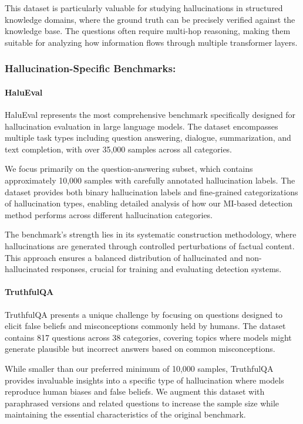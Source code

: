 This dataset is particularly valuable for studying hallucinations in structured knowledge domains, where the ground truth can be precisely verified against the knowledge base. The questions often require multi-hop reasoning, making them suitable for analyzing how information flows through multiple transformer layers.

\subsubsection{Hallucination-Specific Benchmarks:}

\paragraph{HaluEval}
HaluEval \citep{li2023halueval} represents the most comprehensive benchmark specifically designed for hallucination evaluation in large language models. The dataset encompasses multiple task types including question answering, dialogue, summarization, and text completion, with over 35,000 samples across all categories.

We focus primarily on the question-answering subset, which contains approximately 10,000 samples with carefully annotated hallucination labels. The dataset provides both binary hallucination labels and fine-grained categorizations of hallucination types, enabling detailed analysis of how our MI-based detection method performs across different hallucination categories.

The benchmark's strength lies in its systematic construction methodology, where hallucinations are generated through controlled perturbations of factual content. This approach ensures a balanced distribution of hallucinated and non-hallucinated responses, crucial for training and evaluating detection systems.

\paragraph{TruthfulQA}
TruthfulQA \citep{lin2021truthfulqa} presents a unique challenge by focusing on questions designed to elicit false beliefs and misconceptions commonly held by humans. The dataset contains 817 questions across 38 categories, covering topics where models might generate plausible but incorrect answers based on common misconceptions.

While smaller than our preferred minimum of 10,000 samples, TruthfulQA provides invaluable insights into a specific type of hallucination where models reproduce human biases and false beliefs. We augment this dataset with paraphrased versions and related questions to increase the sample size while maintaining the essential characteristics of the original benchmark.

